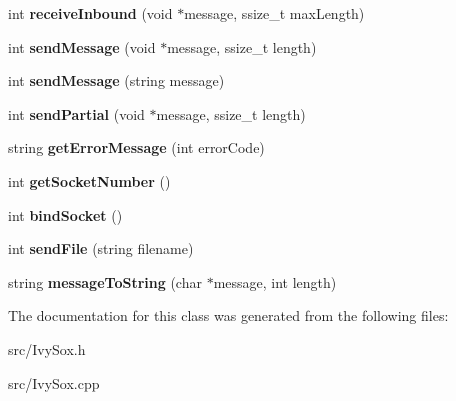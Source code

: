 \begin{DoxyCompactItemize}
\item 
\hypertarget{class_ivy_sox_a967f09bfa3ff35635d3f1e086193b140}{}int {\bfseries receive\+Inbound} (void $\ast$message, ssize\+\_\+t max\+Length)\label{class_ivy_sox_a967f09bfa3ff35635d3f1e086193b140}

\item 
\hypertarget{class_ivy_sox_a8cdc56a285fdd5b87873918c1c397e05}{}int {\bfseries send\+Message} (void $\ast$message, ssize\+\_\+t length)\label{class_ivy_sox_a8cdc56a285fdd5b87873918c1c397e05}

\item 
\hypertarget{class_ivy_sox_a49df5717e5cc8827d5725d832a0c4d17}{}int {\bfseries send\+Message} (string message)\label{class_ivy_sox_a49df5717e5cc8827d5725d832a0c4d17}

\item 
\hypertarget{class_ivy_sox_a3915fbfdfb0c5dd57da460f3de3fc21b}{}int {\bfseries send\+Partial} (void $\ast$message, ssize\+\_\+t length)\label{class_ivy_sox_a3915fbfdfb0c5dd57da460f3de3fc21b}

\item 
\hypertarget{class_ivy_sox_a58dac7efa4d8dbf6a08e98924ae9d584}{}string {\bfseries get\+Error\+Message} (int error\+Code)\label{class_ivy_sox_a58dac7efa4d8dbf6a08e98924ae9d584}

\item 
\hypertarget{class_ivy_sox_a09b0c17b4dda6c69e617e9271e9adb63}{}int {\bfseries get\+Socket\+Number} ()\label{class_ivy_sox_a09b0c17b4dda6c69e617e9271e9adb63}

\item 
\hypertarget{class_ivy_sox_afe73030aff140d6e1baa8324067d7f1a}{}int {\bfseries bind\+Socket} ()\label{class_ivy_sox_afe73030aff140d6e1baa8324067d7f1a}

\item 
\hypertarget{class_ivy_sox_a44b37c71adba4bd408fb8a0c36865b50}{}int {\bfseries send\+File} (string filename)\label{class_ivy_sox_a44b37c71adba4bd408fb8a0c36865b50}

\item 
\hypertarget{class_ivy_sox_ada62b805f634c9652bdd950084f32e33}{}string {\bfseries message\+To\+String} (char $\ast$message, int length)\label{class_ivy_sox_ada62b805f634c9652bdd950084f32e33}

\end{DoxyCompactItemize}


The documentation for this class was generated from the following files\+:\begin{DoxyCompactItemize}
\item 
src/Ivy\+Sox.\+h\item 
src/Ivy\+Sox.\+cpp\end{DoxyCompactItemize}
